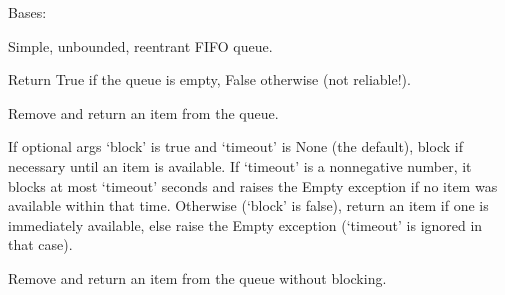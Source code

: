 \documentclass[letterpaper,10pt,english]{sphinxmanual}
\begin{document}
\begin{fulllineitems}
\label{\detokenize{queue:queue.SimpleQueue}}
\pysigstartsignatures
{}
\pysigstopsignatures
\sphinxAtStartPar
Bases: 

\sphinxAtStartPar
Simple, unbounded, reentrant FIFO queue.

\begin{fulllineitems}
\label{\detokenize{queue:queue.SimpleQueue.empty}}
\pysigstartsignatures
{}
\pysigstopsignatures
\sphinxAtStartPar
Return True if the queue is empty, False otherwise (not reliable!).

\end{fulllineitems}


\begin{fulllineitems}
\label{\detokenize{queue:queue.SimpleQueue.get}}
\pysigstartsignatures
{}
\pysigstopsignatures
\sphinxAtStartPar
Remove and return an item from the queue.

\sphinxAtStartPar
If optional args ‘block’ is true and ‘timeout’ is None (the default),
block if necessary until an item is available. If ‘timeout’ is
a non\sphinxhyphen{}negative number, it blocks at most ‘timeout’ seconds and raises
the Empty exception if no item was available within that time.
Otherwise (‘block’ is false), return an item if one is immediately
available, else raise the Empty exception (‘timeout’ is ignored
in that case).

\end{fulllineitems}


\begin{fulllineitems}
\label{\detokenize{queue:queue.SimpleQueue.get_nowait}}
\pysigstartsignatures
{}
\pysigstopsignatures
\sphinxAtStartPar
Remove and return an item from the queue without blocking.


\end{fulllineitems}
\end{fulllineitems}
\end{document}
